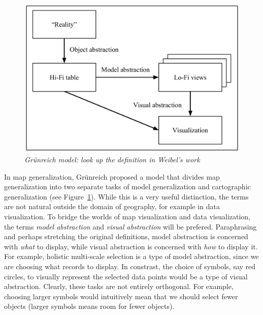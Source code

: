 \documentclass[11pt, oneside]{report}
\begin{document}
{\begin{figure}[htbp]
\begin{center}
\includegraphics[scale=.4]{figs-thesis/gruenreich.pdf}
\caption{\emph{Gr{\"u}nreich model: look up the definition in Weibel's work}}
\label{fig:state:of:the:art:gruenreich}
\end{center}
\vspace*{-4ex}
\end{figure}

In map generalization, Gr{\"u}nreich proposed a model that divides map generalization into two separate tasks of model generalization and cartographic generalization (see Figure~\ref{fig:state:of:the:art:gruenreich}). While this is a very useful distinction, the terms are not natural outside the domain of geography, for example in data visualization. To bridge the worlds of map visualization and data visualization, the terms \emph{model abstraction} and \emph{visual abstraction} will be prefered. Paraphrasing and perhaps stretching the original definitions, model abstraction is concerned with \emph{what} to display, while visual abstraction is concerned with \emph{how} to display it. For example, holistic multi-scale selection is a type of model abstraction, since we are choosing what records to display. In constrast, the choice of symbols, say red circles, to visually represent the selected data points would be a type of visual abstraction. Clearly, these tasks are not entirely orthogonal. For example,  choosing larger symbols would intuitively mean that we should select fewer objects (larger symbols means room for fewer objects).

}
\end{document}
